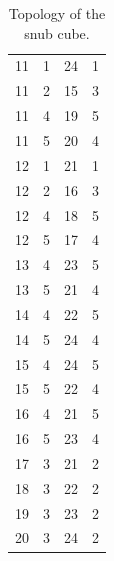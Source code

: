 \documentclass[a4paper, amsfonts, amssymb, amsmath, reprint, showkeys, nofootinbib, oneside]{revtex4-1}
\begin{document}
\begin{table}[h!]
\begin{tabular}{ cccc }
		11 & 1 & 24 & 1 \\
		11 & 2 & 15 & 3 \\
		11 & 4 & 19 & 5 \\
		11 & 5 & 20 & 4 \\
		12 & 1 & 21 & 1 \\
		12 & 2 & 16 & 3 \\
		12 & 4 & 18 & 5 \\
		12 & 5 & 17 & 4 \\
		13 & 4 & 23 & 5 \\
		13 & 5 & 21 & 4 \\
		14 & 4 & 22 & 5 \\
		14 & 5 & 24 & 4 \\
		15 & 4 & 24 & 5 \\
		15 & 5 & 22 & 4 \\
		16 & 4 & 21 & 5 \\
		16 & 5 & 23 & 4 \\
		17 & 3 & 21 & 2 \\
		18 & 3 & 22 & 2 \\
		19 & 3 & 23 & 2 \\
		20 & 3 & 24 & 2 \\
		\hline
	\end{tabular}
	\caption{Topology of the snub cube.}
\end{table}

\pagebreak
\end{document}
